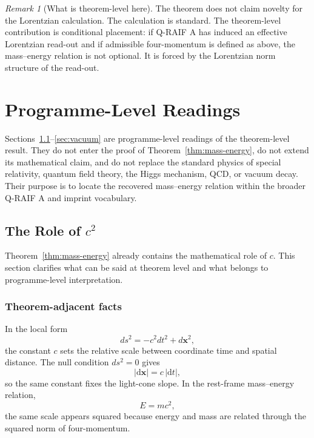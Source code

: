 \documentclass[12pt,a4paper]{article}
\theoremstyle{definition}
\theoremstyle{remark}
\newtheorem{remark}[theorem]{Remark}
\begin{document}
\begin{remark}[What is theorem-level here]
The theorem does not claim novelty for the Lorentzian calculation. The calculation is standard. The theorem-level contribution is conditional placement: if Q-RAIF A has induced an effective Lorentzian read-out and if admissible four-momentum is defined as above, the mass--energy relation is not optional. It is forced by the Lorentzian norm structure of the read-out.
\end{remark}

\section{Programme-Level Readings}
\label{sec:programme-readings}

Sections~\ref{sec:c2}--\ref{sec:vacuum} are programme-level readings of the theorem-level result. They do not enter the proof of Theorem~\ref{thm:mass-energy}, do not extend its mathematical claim, and do not replace the standard physics of special relativity, quantum field theory, the Higgs mechanism, QCD, or vacuum decay. Their purpose is to locate the recovered mass--energy relation within the broader Q-RAIF A and imprint vocabulary.

\subsection{The Role of \texorpdfstring{$c^2$}{c2}}
\label{sec:c2}

Theorem~\ref{thm:mass-energy} already contains the mathematical role of $c$. This section clarifies what can be said at theorem level and what belongs to programme-level interpretation.

\subsubsection{Theorem-adjacent facts}

In the local form
\begin{equation}
ds^2=-c^2dt^2+d\mathbf{x}^2,
\end{equation}
the constant $c$ sets the relative scale between coordinate time and spatial distance. The null condition $ds^2=0$ gives
\begin{equation}
|\mathrm d\mathbf{x}|=c\,|\mathrm dt|,
\end{equation}
so the same constant fixes the light-cone slope. In the rest-frame mass--energy relation,
\begin{equation}
E=mc^2,
\end{equation}
the same scale appears squared because energy and mass are related through the squared norm of four-momentum.
\end{document}
